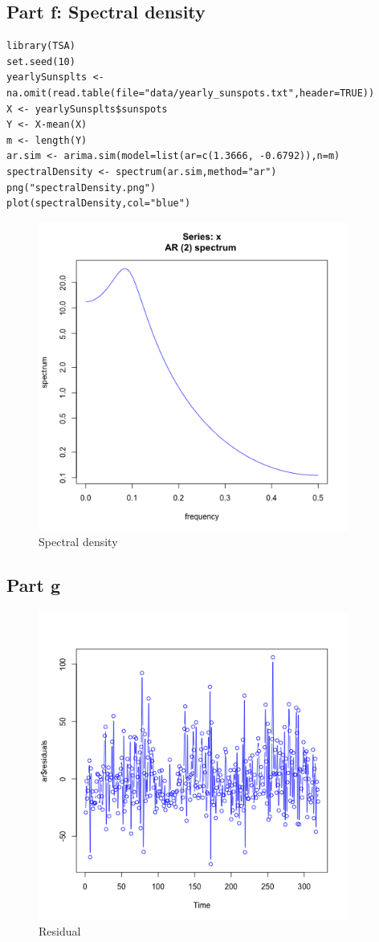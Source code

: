 \documentclass[11pt, oneside]{article}   	%
\begin{document}
\subsection{Part f: Spectral density}
\begin{lstlisting}
library(TSA)
set.seed(10)
yearlySunsplts <- na.omit(read.table(file="data/yearly_sunspots.txt",header=TRUE))
X <- yearlySunsplts$sunspots
Y <- X-mean(X)
m <- length(Y)
ar.sim <- arima.sim(model=list(ar=c(1.3666, -0.6792)),n=m)
spectralDensity <- spectrum(ar.sim,method="ar")
png("spectralDensity.png")
plot(spectralDensity,col="blue")
 \end{lstlisting}
\begin{figure}[H] %
   \centering
   \includegraphics[width=4in]{spectralDensity} 
   \caption{Spectral density}
   \label{fig:per}
\end{figure}

 \subsection{Part g}
 \begin{figure}[H] %
    \centering
    \includegraphics[width=4in]{residual.png} 
    \caption{Residual}
    \label{fig:res}
 \end{figure}
 
\end{document}
